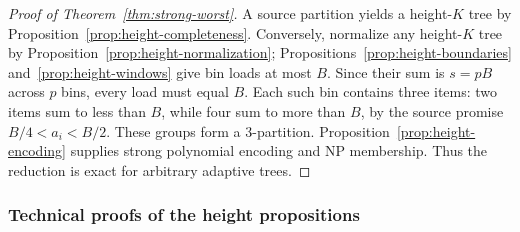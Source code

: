 \begin{proof}[Proof of Theorem~\ref{thm:strong-worst}]
A source partition yields a height-$K$ tree by
Proposition~\ref{prop:height-completeness}. Conversely, normalize any
height-$K$ tree by Proposition~\ref{prop:height-normalization};
Propositions~\ref{prop:height-boundaries} and~\ref{prop:height-windows}
give bin loads at most $B$. Since their sum is $s=pB$ across $p$ bins,
every load must equal $B$. Each such bin contains three items: two
items sum to less than $B$, while four sum to more than $B$, by the
source promise $B/4<a_i<B/2$. These groups form a 3-partition.
Proposition~\ref{prop:height-encoding} supplies strong polynomial
encoding and NP membership. Thus the reduction is exact for arbitrary
adaptive trees.
\end{proof}

\subsubsection{Technical proofs of the height propositions}

